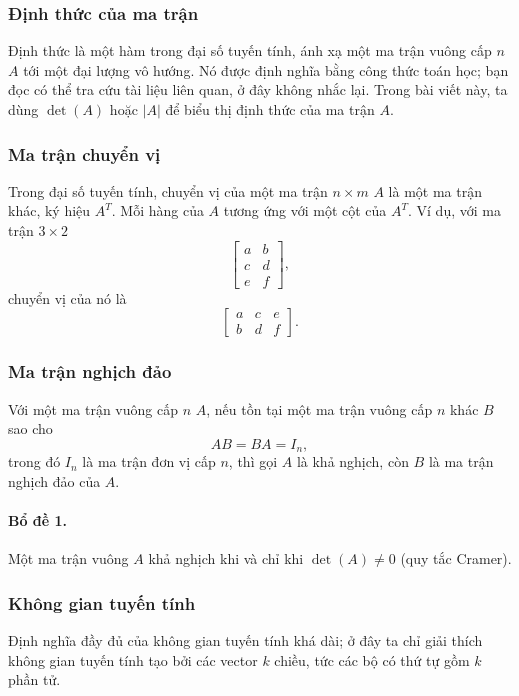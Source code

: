 \documentclass[11pt]{article}
\begin{document}
\subsubsection{Định thức của ma trận}

Định thức là một hàm trong đại số tuyến tính, ánh xạ một ma trận vuông cấp \(n\)
\(A\) tới một đại lượng vô hướng. Nó được định nghĩa bằng công thức toán học;
bạn đọc có thể tra cứu tài liệu liên quan, ở đây không nhắc lại. Trong bài viết
này, ta dùng \(\det(A)\) hoặc \(|A|\) để biểu thị định thức của ma trận \(A\).

\subsubsection{Ma trận chuyển vị}

Trong đại số tuyến tính, chuyển vị của một ma trận \(n\times m\) \(A\) là một ma
trận khác, ký hiệu \(A^T\). Mỗi hàng của \(A\) tương ứng với một cột của
\(A^T\). Ví dụ, với ma trận \(3\times2\)
\[
  \begin{bmatrix}
    a & b\\
    c & d\\
    e & f
  \end{bmatrix},
\]
chuyển vị của nó là
\[
  \begin{bmatrix}
    a & c & e\\
    b & d & f
  \end{bmatrix}.
\]

\subsubsection{Ma trận nghịch đảo}

Với một ma trận vuông cấp \(n\) \(A\), nếu tồn tại một ma trận vuông cấp \(n\)
khác \(B\) sao cho
\[
  AB=BA=I_n,
\]
trong đó \(I_n\) là ma trận đơn vị cấp \(n\), thì gọi \(A\) là khả nghịch, còn
\(B\) là ma trận nghịch đảo của \(A\).

\paragraph{Bổ đề 1.}
Một ma trận vuông \(A\) khả nghịch khi và chỉ khi \(\det(A)\ne0\) (quy tắc
Cramer).

\subsubsection{Không gian tuyến tính}

Định nghĩa đầy đủ của không gian tuyến tính khá dài; ở đây ta chỉ giải thích
không gian tuyến tính tạo bởi các vector \(k\) chiều, tức các bộ có thứ tự gồm
\(k\) phần tử.
\end{document}
